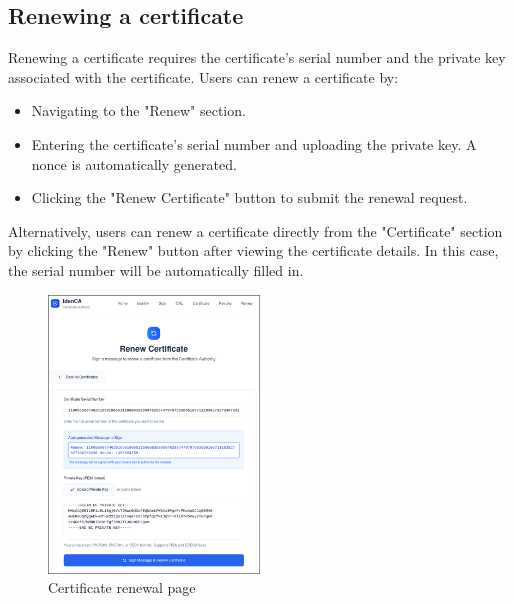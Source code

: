 \subsection{Renewing a certificate}
Renewing a certificate requires the certificate's serial number and the 
private key associated with the certificate. Users can renew a certificate by:
\begin{itemize}
    \item Navigating to the "Renew" section.
    \item Entering the certificate's serial number and uploading the private key. A 
            nonce is automatically generated.
    \item Clicking the "Renew Certificate" button to submit the renewal request.
\end{itemize}
Alternatively, users can renew a certificate directly from the "Certificate" section by 
clicking the "Renew" button after viewing the certificate details.
In this case, the serial number will be automatically filled in.
\begin{figure}[h!]
    \centering
    \includegraphics[keepaspectratio, width=0.5\textwidth]{Pic/6_renew_certificate.png}
    \caption{Certificate renewal page}
    \label{fig:certificate-renew}
\end{figure}
